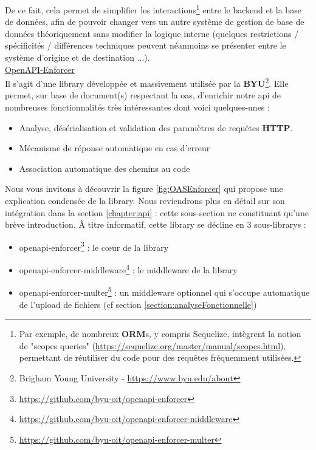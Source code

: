 De ce fait, cela permet de simplifier les interactions\footnote{
    Par exemple, de nombreux \textbf{ORM}s, y compris Sequelize, intègrent la notion de "scopes queries" (\url{https://sequelize.org/master/manual/scopes.html}), permettant de réutiliser du code pour des requêtes fréquemment utilisées.
} entre le \gls{backend} et la base de données, afin de pouvoir changer vers un autre système de gestion de base de données théoriquement sans modifier la logique interne 
(quelques restrictions / spécificités / différences techniques peuvent néanmoins se présenter entre le système d'origine et de destination ...). \\

\noindent\underline{OpenAPI-Enforcer}\\

Il s'agit d'une \gls{library} développée et massivement utilisée par la \textbf{BYU}\footnote{
    Brigham Young University - \url{https://www.byu.edu/about}
}. 
Elle permet, sur base de document(s) respectant la \Gls{oas}, d'enrichir notre \Gls{api} de nombreuses fonctionnalités très intéressantes dont voici quelques-unes :

\begin{itemize}
    \item Analyse, désérialisation et validation des paramètres de requêtes \textbf{HTTP}.
    \item Mécanisme de réponse automatique en cas d'erreur
    \item Association automatique des chemins au code
\end{itemize}

Nous vous invitons à découvrir la figure \ref{fig:OASEnforcer} qui propose une explication condensée de la \gls{library}.
Nous reviendrons plus en détail sur son intégration dans la section \ref{chapter:api} : cette sous-section ne constituant qu'une brève introduction.
À titre informatif, cette \gls{library} se décline en 3 sous-\glspl{library} :

\begin{itemize}
    \item openapi-enforcer\footnote{
        \url{https://github.com/byu-oit/openapi-enforcer}
    } : le cœur de la \gls{library}
    \item openapi-enforcer-middleware\footnote{
        \url{https://github.com/byu-oit/openapi-enforcer-middleware}
    } : le \gls{middleware} de la \gls{library}
    \item openapi-enforcer-multer\footnote{
        \url{https://github.com/byu-oit/openapi-enforcer-multer}
    } : un \gls{middleware} optionnel qui s'occupe automatique de l'upload de fichiers (cf section \ref{section:analyseFonctionnelle})
\end{itemize}

